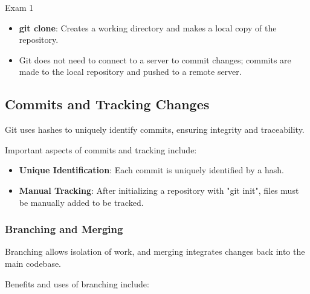 \begin{examnotes}{Exam 1}
\begin{highlight}
        \begin{itemize}
            \item \textbf{git clone}: Creates a working directory and makes a local copy of the repository.
            \item Git does not need to connect to a server to commit changes; commits are made to the local repository and pushed to a remote server.
        \end{itemize}
    \end{highlight}
    
    \subsection*{Commits and Tracking Changes}
    
    Git uses hashes to uniquely identify commits, ensuring integrity and traceability.
    
    \begin{highlight}
        Important aspects of commits and tracking include:
        
        \begin{itemize}
            \item \textbf{Unique Identification}: Each commit is uniquely identified by a hash.
            \item \textbf{Manual Tracking}: After initializing a repository with "git init", files must be manually added to be tracked.
        \end{itemize}
    \end{highlight}
    
    \subsubsection*{Branching and Merging}
    
    Branching allows isolation of work, and merging integrates changes back into the main codebase.
    
    \begin{highlight}
        Benefits and uses of branching include:
        

\end{highlight}
\end{examnotes}
